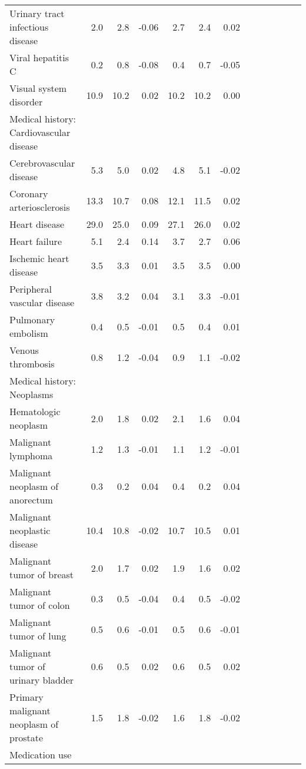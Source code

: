 \documentclass[11pt,]{article}
\begin{document}
\begin{longtable}{lrrrrrrrrrrrr}
      Urinary tract infectious disease &  2.0 &  2.8 & -0.06 &  2.7 &  2.4 &  0.02 \\ 
      Viral hepatitis C &  0.2 &  0.8 & -0.08 &  0.4 &  0.7 & -0.05 \\ 
      Visual system disorder & 10.9 & 10.2 &  0.02 & 10.2 & 10.2 &  0.00 \\ 
  Medical history: Cardiovascular disease &    &    &     &    &    &     \\ 
      Cerebrovascular disease &  5.3 &  5.0 &  0.02 &  4.8 &  5.1 & -0.02 \\ 
      Coronary arteriosclerosis & 13.3 & 10.7 &  0.08 & 12.1 & 11.5 &  0.02 \\ 
      Heart disease & 29.0 & 25.0 &  0.09 & 27.1 & 26.0 &  0.02 \\ 
      Heart failure &  5.1 &  2.4 &  0.14 &  3.7 &  2.7 &  0.06 \\ 
      Ischemic heart disease &  3.5 &  3.3 &  0.01 &  3.5 &  3.5 &  0.00 \\ 
      Peripheral vascular disease &  3.8 &  3.2 &  0.04 &  3.1 &  3.3 & -0.01 \\ 
      Pulmonary embolism &  0.4 &  0.5 & -0.01 &  0.5 &  0.4 &  0.01 \\ 
      Venous thrombosis &  0.8 &  1.2 & -0.04 &  0.9 &  1.1 & -0.02 \\ 
  Medical history: Neoplasms &    &    &     &    &    &     \\ 
      Hematologic neoplasm &  2.0 &  1.8 &  0.02 &  2.1 &  1.6 &  0.04 \\ 
      Malignant lymphoma &  1.2 &  1.3 & -0.01 &  1.1 &  1.2 & -0.01 \\ 
      Malignant neoplasm of anorectum &  0.3 &  0.2 &  0.04 &  0.4 &  0.2 &  0.04 \\ 
      Malignant neoplastic disease & 10.4 & 10.8 & -0.02 & 10.7 & 10.5 &  0.01 \\ 
      Malignant tumor of breast &  2.0 &  1.7 &  0.02 &  1.9 &  1.6 &  0.02 \\ 
      Malignant tumor of colon &  0.3 &  0.5 & -0.04 &  0.4 &  0.5 & -0.02 \\ 
      Malignant tumor of lung &  0.5 &  0.6 & -0.01 &  0.5 &  0.6 & -0.01 \\ 
      Malignant tumor of urinary bladder &  0.6 &  0.5 &  0.02 &  0.6 &  0.5 &  0.02 \\ 
      Primary malignant neoplasm of prostate &  1.5 &  1.8 & -0.02 &  1.6 &  1.8 & -0.02 \\ 
  Medication use &    &    &     &    &    &     \\ 

\end{longtable}
\end{document}
